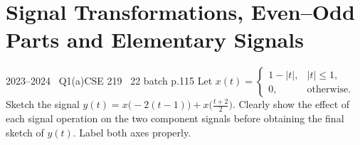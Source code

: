 \renewcommand{\teacherTag}{ANIK SIR \textbullet\ LECTURES 1--2}
\chapter{Signal Transformations, Even--Odd Parts and Elementary Signals}

\begin{qcard}{2023--2024 \textbullet\ Q1(a)}{CSE 219 \textbullet\ 22 batch p.1}{15}
Let $x(t)=\begin{cases}1-|t|,&|t|\le1,\\0,&\text{otherwise.}\end{cases}$ Sketch the signal $y(t)=x\big(-2(t-1)\big)+x\!\big(\tfrac{t+2}{2}\big)$. Clearly show the effect of each signal operation on the two component signals before obtaining the final sketch of $y(t)$. Label both axes properly.
\end{qcard}
